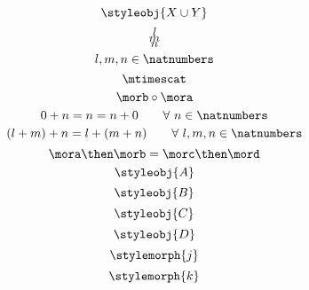 {\begin{forslides}
\begin{equation}
            \label{eq:37}
            \styleobj{X \cup Y}
        \end{equation}
%
        \begin{equation}
            \label{eq:38}
            l
        \end{equation}
%
        \begin{equation}
            \label{eq:39}
            m
        \end{equation}
%
        \begin{equation}
            \label{eq:40}
            n
        \end{equation}
%
        \begin{equation}
            \label{eq:41}
            l, m, n \in \natnumbers
        \end{equation}
%
        \begin{equation}
            \label{eq:42}
            \mtimescat
        \end{equation}
%
        \begin{equation}
            \label{eq:43}
            \morb \circ \mora
        \end{equation}
%
        \begin{equation}
            \label{eq:44}
            0 + n = n = n + 0   \quad \quad \forall \ n \in \natnumbers
        \end{equation}
%
        \begin{equation}
            \label{eq:45}
            (l + m) + n = l + (m + n) \quad \quad  \forall \ l, m, n \in \natnumbers
        \end{equation}
%
        \begin{equation}
            \label{eq:46}
            \mora \then \morb = \morc \then \mord
        \end{equation}
%
        \begin{equation}
            \label{eq:47}
            \styleobj{A}
        \end{equation}
%
        \begin{equation}
            \label{eq:48}
            \styleobj{B}
        \end{equation}
%
        \begin{equation}
            \label{eq:49}
            \styleobj{C}
        \end{equation}
%
        \begin{equation}
            \label{eq:50}
            \styleobj{D}
        \end{equation}
%
        \begin{equation}
            \label{eq:51}
            \stylemorph{j}
        \end{equation}
%
        \begin{equation}
            \label{eq:52}
            \stylemorph{k}
        \end{equation}
%
    \end{forslides}
}


